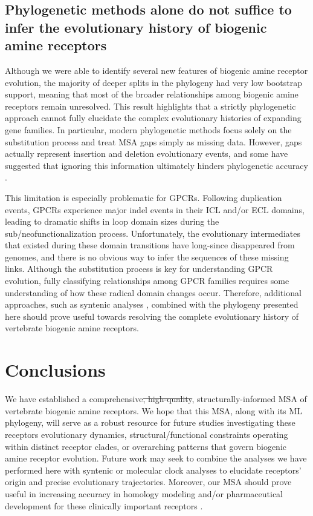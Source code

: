 \documentclass[fleqn,10pt]{wlpeerj}
\providecommand{\DIFdeltex}[1]{{\protect\color{red}\sout{#1}}}                      %
\providecommand{\DIFdelbegin}{} %
\providecommand{\DIFdelend}{} %
\providecommand{\DIFdel}[1]{\texorpdfstring{\DIFdeltex{#1}}{}} %
\begin{document}
\subsection*{Phylogenetic methods alone do not suffice to infer the evolutionary history of biogenic amine receptors}
Although we were able to identify several new features of biogenic amine receptor evolution, the majority of deeper splits in the phylogeny had very low bootstrap support, meaning that most of the broader relationships among biogenic amine receptors remain unresolved. This result highlights that a strictly phylogenetic approach cannot fully elucidate the complex evolutionary histories of expanding gene families. In particular, modern phylogenetic methods focus solely on the substitution process and treat MSA gaps simply as missing data. However, gaps actually represent insertion and deletion evolutionary events, and some have suggested that ignoring this information ultimately hinders phylogenetic accuracy \citep{Morrison2008,Loytynoja2008,Warnow2012,Luanetal2013}. 

This limitation is especially problematic for GPCRs. Following duplication events, GPCRs experience major indel events in their ICL and/or ECL domains, leading to dramatic shifts in loop domain sizes during the sub/neofunctionalization process. Unfortunately, the evolutionary intermediates that existed during these domain transitions have long-since disappeared from genomes, and there is no obvious way to infer the sequences of these missing links. Although the substitution process is key for understanding GPCR evolution, fully classifying relationships among GPCR families requires some understanding of how these radical domain changes occur. Therefore, additional approaches, such as syntenic analyses \citep{Sundstrom2010,Widmark2011,YegorovGood2012,Hwangetal2013}, combined with the phylogeny presented here should prove useful towards resolving the complete evolutionary history of vertebrate biogenic amine receptors. 


\section*{Conclusions}

We have established a comprehensive\DIFdelbegin \DIFdel{, high-quality}\DIFdelend , structurally-informed MSA of vertebrate biogenic amine receptors. We hope that this MSA, along with its ML phylogeny, will serve as a robust resource for future studies investigating these receptors evolutionary dynamics, structural/functional constraints operating within distinct receptor clades, or overarching patterns that govern biogenic amine receptor evolution. Future work may seek to combine the analyses we have performed here with syntenic or molecular clock analyses to elucidate receptors' origin and precise evolutionary trajectories. Moreover, our MSA should prove useful in increasing accuracy in homology modeling and/or pharmaceutical development for these clinically important receptors \citep{Kristiansen2004,Ishiguro2004,Eversetal2005,Masonetal2012}.
\end{document}
